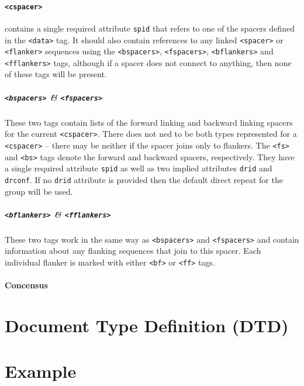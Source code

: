 \documentclass[11pt]{article} %
\begin{document}
\paragraph{\lstinline[language=XML_new]$<cspacer>$}
contains a single required attribute \lstinline[language=XML_new]$spid$ that refers to one of the spacers defined in the \lstinline[language=XML_new]$<data>$ tag.  It should also contain references to any linked \lstinline[language=XML_new]$<spacer>$ or \lstinline[language=XML_new]$<flanker>$ sequences using the \lstinline[language=XML_new]$<bspacers>$, \lstinline[language=XML_new]$<fspacers>$, \lstinline[language=XML_new]$<bflankers>$ and \lstinline[language=XML_new]$<fflankers>$ tags, although if a spacer does not connect to anything, then none of these tags will be present.
\subparagraph{\lstinline[language=XML_new]$<bspacers>$ \& \lstinline[language=XML_new]$<fspacers>$}
These two tags contain lists of the forward linking and backward linking spacers for the current  \lstinline[language=XML_new]$<cspacer>$.  There does not ned to be both types represented for a \lstinline[language=XML_new]$<cspacer>$ -- there may be neither if the spacer joins only to flankers.  The \lstinline[language=XML_new]$<fs>$ and \lstinline[language=XML_new]$<bs>$ tags denote the forward and backward spacers, respectively.  They have a single required attribute \lstinline[language=XML_new]$spid$ as well as two implied attributes \lstinline[language=XML_new]$drid$ and \lstinline[language=XML_new]$drconf$.  If no \lstinline[language=XML_new]$drid$ attribute is provided then the default direct repeat for the group will be used.
\subparagraph{\lstinline[language=XML_new]$<bflankers>$ \& \lstinline[language=XML_new]$<fflankers>$}
These two tags work in the same way as \lstinline[language=XML_new]$<bspacers>$ and \lstinline[language=XML_new]$<fspacers>$ and contain information about any flanking sequences that join to this spacer.  Each individual flanker is marked with either \lstinline[language=XML_new]$<bf>$ or \lstinline[language=XML_new]$<ff>$ tags.  
\paragraph{Concensus}

\section{Document Type Definition (DTD)}


\section{Example}
\end{document}
